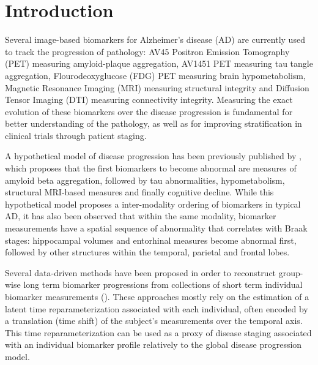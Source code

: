\documentclass{llncs}
\begin{document}
\section{Introduction}


Several image-based biomarkers for Alzheimer's disease (AD) are currently used to track the progression of pathology: AV45 Positron Emission Tomography (PET) measuring amyloid-plaque aggregation, AV1451 PET measuring tau tangle aggregation, Flourodeoxyglucose (FDG) PET measuring brain hypometabolism, Magnetic Resonance Imaging (MRI) measuring structural integrity and Diffusion Tensor Imaging (DTI) measuring connectivity integrity. Measuring the exact evolution of these biomarkers over the disease progression is fundamental for better understanding of the pathology, as well as for improving stratification in clinical trials through patient staging.

A hypothetical model of disease progression has been previously published by \cite{jack2010hypothetical}, which proposes that the first biomarkers to become abnormal are measures of amyloid beta aggregation, followed by tau abnormalities, hypometabolism, structural MRI-based measures and finally cognitive decline. While this hypothetical model proposes a inter-modality ordering of biomarkers in typical AD, it has also been observed that within the same modality, biomarker measurements have a spatial sequence of abnormality that correlates with Braak stages: hippocampal volumes and entorhinal measures become abnormal first, followed by other structures within the temporal, parietal and frontal lobes.

Several data-driven methods have been proposed in order to reconstruct group-wise long term biomarker progressions from collections of short term individual biomarker measurements (\cite{lorenzi2017disease,young2014data,donohue2014estimating}). These approaches mostly rely on the estimation of a latent time reparameterization associated with each individual, often encoded by a translation (time shift) of the subject's measurements over the temporal axis.  This time reparameterization can be used as a proxy of disease staging associated with an individual biomarker profile relatively to the global disease progression model. 
\end{document}

